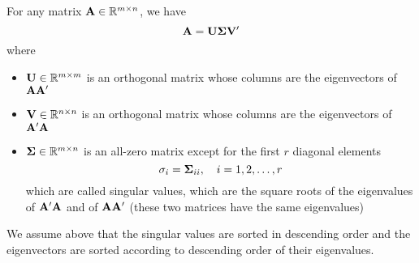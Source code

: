 \begin{definition}
	For any matrix \(\mathbf{A}\in\mathbb{R}^{m\times n}\), we have
	\begin{equation}
		\mathbf{A}=\mathbf{U}\boldsymbol{\Sigma}\mathbf{V}^{\prime}
	\end{equation}
	where
	\begin{itemize}
		\item \(\mathbf{U}\in\mathbb{R}^{m\times m}\) is an orthogonal matrix whose columns are the eigenvectors of \(\mathbf{A}\mathbf{A}^{\prime}\)
		\item \(\mathbf{V}\in\mathbb{R}^{n\times n}\) is an orthogonal matrix whose columns are the eigenvectors of \(\mathbf{A}^{\prime}\mathbf{A}\)
		\item \(\boldsymbol{\Sigma}\in\mathbb{R}^{m\times n}\) is an all-zero matrix except for the first \(r\) diagonal elements
		      \begin{equation*}
			      \sigma_{i}=\boldsymbol{\Sigma}_{ii},\quad i=1,2,\ldots,r
		      \end{equation*}
		      which are called singular values, which are the square roots of the eigenvalues of \(\mathbf{A}^{\prime}\mathbf{A}\) and of \(\mathbf{A}\mathbf{A}^{\prime}\) (these two matrices have the same eigenvalues)
	\end{itemize}
\end{definition}

\begin{remark}
	We assume above that the singular values are sorted in descending order and the eigenvectors are sorted according to descending order of their eigenvalues.
\end{remark}

